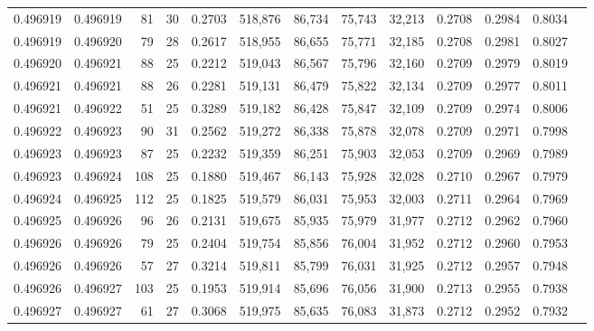 \begin{tabular}{rrrrrrrrrrrrr}
0.496919 & 0.496919 &  81 &  30 &                                     0.2703 & 518,876 &  86,734 &  75,743 &  32,213 & 0.2708 & 0.2984 & 0.8034 \\
0.496919 & 0.496920 &  79 &  28 &                                     0.2617 & 518,955 &  86,655 &  75,771 &  32,185 & 0.2708 & 0.2981 & 0.8027 \\
0.496920 & 0.496921 &  88 &  25 &                                     0.2212 & 519,043 &  86,567 &  75,796 &  32,160 & 0.2709 & 0.2979 & 0.8019 \\
0.496921 & 0.496921 &  88 &  26 &                                     0.2281 & 519,131 &  86,479 &  75,822 &  32,134 & 0.2709 & 0.2977 & 0.8011 \\
0.496921 & 0.496922 &  51 &  25 &                                     0.3289 & 519,182 &  86,428 &  75,847 &  32,109 & 0.2709 & 0.2974 & 0.8006 \\
0.496922 & 0.496923 &  90 &  31 &                                     0.2562 & 519,272 &  86,338 &  75,878 &  32,078 & 0.2709 & 0.2971 & 0.7998 \\
0.496923 & 0.496923 &  87 &  25 &                                     0.2232 & 519,359 &  86,251 &  75,903 &  32,053 & 0.2709 & 0.2969 & 0.7989 \\
0.496923 & 0.496924 & 108 &  25 &                                     0.1880 & 519,467 &  86,143 &  75,928 &  32,028 & 0.2710 & 0.2967 & 0.7979 \\
0.496924 & 0.496925 & 112 &  25 &                                     0.1825 & 519,579 &  86,031 &  75,953 &  32,003 & 0.2711 & 0.2964 & 0.7969 \\
0.496925 & 0.496926 &  96 &  26 &                                     0.2131 & 519,675 &  85,935 &  75,979 &  31,977 & 0.2712 & 0.2962 & 0.7960 \\
0.496926 & 0.496926 &  79 &  25 &                                     0.2404 & 519,754 &  85,856 &  76,004 &  31,952 & 0.2712 & 0.2960 & 0.7953 \\
0.496926 & 0.496926 &  57 &  27 &                                     0.3214 & 519,811 &  85,799 &  76,031 &  31,925 & 0.2712 & 0.2957 & 0.7948 \\
0.496926 & 0.496927 & 103 &  25 &                                     0.1953 & 519,914 &  85,696 &  76,056 &  31,900 & 0.2713 & 0.2955 & 0.7938 \\
0.496927 & 0.496927 &  61 &  27 &                                     0.3068 & 519,975 &  85,635 &  76,083 &  31,873 & 0.2712 & 0.2952 & 0.7932 \\

\end{tabular}
